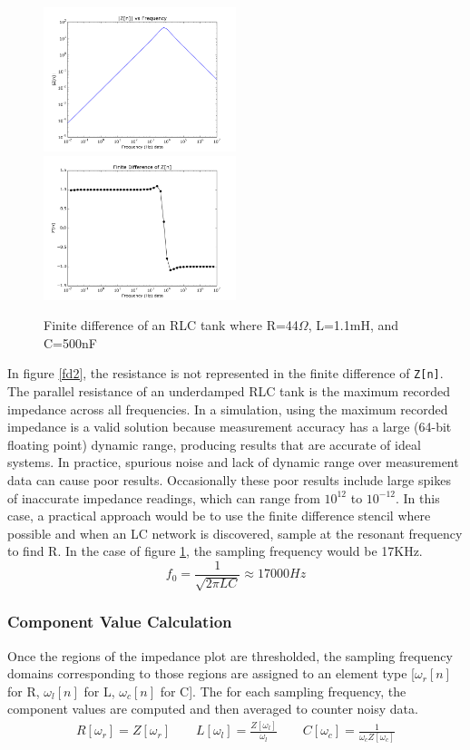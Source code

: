 \begin{figure}[H]
\includegraphics[width=0.5\textwidth]{../fd2.png}
\includegraphics[width=0.5\textwidth]{../fd1.png}
\caption{Finite difference of an RLC tank where R=44$\Omega$, L=1.1mH, and C=500nF}
\label{fig:fd2}
\end{figure}

In figure \ref{fd2}, the resistance is not represented in the finite difference of \texttt{Z[n]}.
The parallel resistance of an underdamped RLC tank is the maximum recorded impedance across all frequencies.
In a simulation, using the maximum recorded impedance is a valid solution because measurement accuracy has a large (64-bit floating point) dynamic range, producing results that are accurate of ideal systems.
In practice, spurious noise and lack of dynamic range over measurement data can cause poor results.
Occasionally these poor results include large spikes of inaccurate impedance readings, which can range from $10^{12}$ to $10^{-12}$.
In this case, a practical approach would be to use the finite difference stencil where possible and when an LC network is discovered, sample at the resonant frequency to find R. 
In the case of figure \ref{fig:fd2}, the sampling frequency would be 17KHz.
\begin{equation*}
f_{0} = \frac{1}{\sqrt{2\pi L C}} \approx 17000 Hz
\end{equation*}

\subsubsection{Component Value Calculation}
Once the regions of the impedance plot are thresholded, the sampling frequency domains corresponding to those regions are assigned to an element type [$\omega_r[n]$ for R, $\omega_l[n]$ for L, $\omega_c[n]$ for C].
The for each sampling frequency, the component values are computed and then averaged to counter noisy data.
\begin{align*}
R[\omega_r] = Z[\omega_r] \qquad
L[\omega_l] = \frac{Z[\omega_l]}{\omega_l} \qquad
C[\omega_c] = \frac{1}{\omega_c Z[\omega_c]}  
\end{align*}

